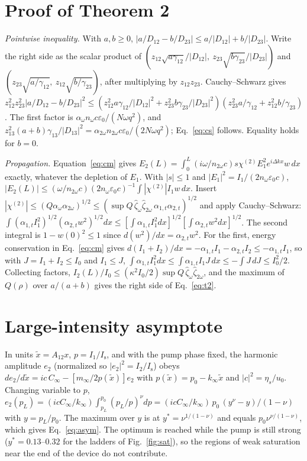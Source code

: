 \documentclass[11pt]{article}
\newcommand{\chitwo}{\chi^{(2)}}
\newcommand{\aw}{\alpha_{\omega}}
\newcommand{\aww}{\alpha_{2\omega}}
\newcommand{\Is}{I_\mathrm{s}}
\begin{document}
\appendix
\section{Proof of Theorem 2}\label{app:proof}
\emph{Pointwise inequality.} With $a,b\ge0$, $|a/D_{12}-b/D_{23}|\le a/|D_{12}|+b/|D_{23}|$. Write the right side as the scalar product of $(z_{12}\sqrt{a\gamma_{12}}/|D_{12}|,\ z_{23}\sqrt{b\gamma_{23}}/|D_{23}|)$ and $(z_{23}\sqrt{a/\gamma_{12}},\ z_{12}\sqrt{b/\gamma_{23}})$, after multiplying by $z_{12}z_{23}$. Cauchy--Schwarz gives $z_{12}^2z_{23}^2|a/D_{12}-b/D_{23}|^2\le(z_{12}^2a\gamma_{12}/|D_{12}|^2+z_{23}^2b\gamma_{23}/|D_{23}|^2)(z_{23}^2a/\gamma_{12}+z_{12}^2b/\gamma_{23})$. The first factor is $\aw n_\omega c\varepsilon_0/(N\omega q^2)$, and $z_{13}^2(a+b)\gamma_{13}/|D_{13}|^2=\aww n_{2\omega}c\varepsilon_0/(2N\omega q^2)$; Eq.~\eqref{eq:cs} follows. Equality holds for $b=0$.

\emph{Propagation.} Equation~\eqref{eq:cm} gives $E_2(L)=\int_0^L(i\omega/n_{2\omega}c)s\chitwo E_1^2e^{i\Delta kx}w\,dx$ exactly, whatever the depletion of $E_1$. With $|s|\le1$ and $|E_1|^2=I_1/(2n_\omega\varepsilon_0c)$,
$|E_2(L)|\le(\omega/n_{2\omega}c)(2n_\omega\varepsilon_0c)^{-1}\int|\chitwo|I_1w\,dx$. Insert $|\chitwo|\le(Q\aw\aww)^{1/2}\le(\sup Q\,\hat\zeta_\omega\hat\zeta_{2\omega}\,\alpha_{1,t}\alpha_{2,t})^{1/2}$ and apply Cauchy--Schwarz: $\int(\alpha_{1,t}I_1^2)^{1/2}(\alpha_{2,t}w^2)^{1/2}dx\le[\int\alpha_{1,t}I_1^2dx]^{1/2}[\int\alpha_{2,t}w^2dx]^{1/2}$. The second integral is $1-w(0)^2\le1$ since $d(w^2)/dx=\alpha_{2,t}w^2$. For the first, energy conservation in Eq.~\eqref{eq:cm} gives $d(I_1+I_2)/dx=-\alpha_{1,t}I_1-\alpha_{2,t}I_2\le-\alpha_{1,t}I_1$, so with $J=I_1+I_2\le I_0$ and $I_1\le J$, $\int\alpha_{1,t}I_1^2dx\le\int\alpha_{1,t}I_1J\,dx\le-\int J\,dJ\le I_0^2/2$. Collecting factors, $I_2(L)/I_0\le(\kappa^2I_0/2)\sup Q\,\hat\zeta_\omega\hat\zeta_{2\omega}$, and the maximum of $Q(\rho)$ over $a/(a+b)$ gives the right side of Eq.~\eqref{eq:t2}.

\section{Large-intensity asymptote}\label{app:asym}
In units $\tilde x=A_{12}x$, $p=I_1/\Is$, and with the pump phase fixed, the harmonic amplitude $e_2$ (normalized so $|e_2|^2=I_2/\Is$) obeys $de_2/d\tilde x=ic\,C_\infty-[m_\infty/2p(\tilde x)]e_2$ with $p(\tilde x)=p_0-k_\infty\tilde x$ and $|c|^2=\eta_s/u_0$. Changing variable to $p$, $e_2(p_L)=(icC_\infty/k_\infty)\int_{p_L}^{p_0}(p_L/p)^\nu dp=(icC_\infty/k_\infty)\,p_0\,(y^\nu-y)/(1-\nu)$ with $y=p_L/p_0$. The maximum over $y$ is at $y^*=\nu^{1/(1-\nu)}$ and equals $p_0\nu^{\nu/(1-\nu)}$, which gives Eq.~\eqref{eq:asym}. The optimum is reached while the pump is still strong ($y^*=0.13$--$0.32$ for the ladders of Fig.~\ref{fig:sat}), so the regions of weak saturation near the end of the device do not contribute.
\end{document}
